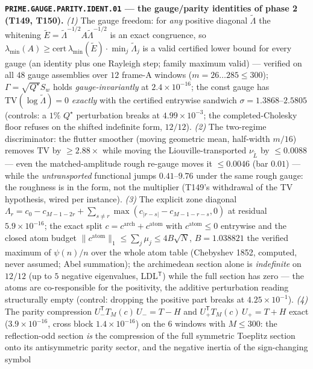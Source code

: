 \documentclass[11pt,a4paper]{article}
\begin{document}
\par\smallskip\noindent\textbf{\texttt{PRIME.GAUGE.PARITY.IDENT.01} --- the
gauge/parity identities of phase 2 (T149, T150).}
\emph{(1)} The gauge freedom: for \emph{any} positive diagonal
$\tilde\Lambda$ the whitening $\tilde E=\tilde\Lambda^{-1/2}A
\tilde\Lambda^{-1/2}$ is an exact congruence, so
$\lambda_{\min}(A)\ge\mathrm{cert}\,\lambda_{\min}(\tilde E)\cdot
\min_j\tilde\Lambda_j$ is a valid certified lower bound for every gauge (an
identity plus one Rayleigh step; family maximum valid) --- verified on all
$48$ gauge assemblies over $12$ frame-A windows ($m=26\ldots285\le300$);
$\Gamma=\sqrt{Q^\star}S_w$ holds \emph{gauge-invariantly} at
$2.4\times10^{-16}$; the const gauge has
$\mathrm{TV}(\log\tilde\Lambda)=0$ \emph{exactly} with the certified
entrywise sandwich $\sigma=1.3868$--$2.5805$ (controls: a $1\%$ $Q^\star$
perturbation breaks at $4.99\times10^{-3}$; the completed-Cholesky floor
refuses on the shifted indefinite form, $12/12$). \emph{(2)} The two-regime
discriminator: the flutter smoother (moving geometric mean, half-width
$m/16$) removes $\mathrm{TV}$ by $\ge2.88\times$ while moving the
Liouville-transported $\nu_{\tilde L}$ by $\le0.0088$ --- even the
matched-amplitude rough re-gauge moves it $\le0.0046$ (bar $0.01$) --- while
the \emph{untransported} functional jumps $0.41$--$9.76$ under the same
rough gauge: the roughness is in the form, not the multiplier (T149's
withdrawal of the TV hypothesis, wired per instance). \emph{(3)} The
explicit zone diagonal
$\Lambda_r=c_0-c_{M-1-2r}+\sum_{s\ne r}\max(c_{|r-s|}-c_{M-1-r-s},0)$ at
residual $5.9\times10^{-16}$; the exact split
$c=c^{\mathrm{arch}}+c^{\mathrm{atom}}$ with $c^{\mathrm{atom}}\le0$
entrywise and the closed atom budget
$\|c^{\mathrm{atom}}\|_1\le\sum_j\mu_j\le4B\sqrt N$, $B=1.038821$ the
verified maximum of $\psi(n)/n$ over the whole atom table (Chebyshev 1852,
computed, never assumed; Abel summation); the archimedean section alone is
\emph{indefinite} on $12/12$ (up to $5$ negative eigenvalues,
LDL$^{\mathsf T}$) while the full section has zero --- the atoms are
co-responsible for the positivity, the additive perturbation reading
structurally empty (control: dropping the positive part breaks at
$4.25\times10^{-1}$). \emph{(4)} The parity compression
$U_-^{\mathsf T}T_M(c)\,U_-=T-H$ and $U_+^{\mathsf T}T_M(c)\,U_+=T+H$
exact ($3.9\times10^{-16}$, cross block $1.4\times10^{-16}$) on the $6$
windows with $M\le300$: the reflection-odd section \emph{is} the
compression of the full symmetric Toeplitz section onto its antisymmetric
parity sector, and the negative inertia of the sign-changing symbol
\end{document}
